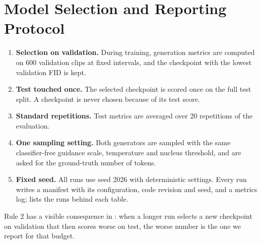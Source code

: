 \section{Model Selection and Reporting Protocol}
\label{sec:protocol_selection}

\begin{enumerate}
\item \textbf{Selection on validation.} During training, generation metrics are computed on 600 validation clips at fixed intervals, and the checkpoint with the lowest validation FID is kept.
\item \textbf{Test touched once.} The selected checkpoint is scored once on the full test split. A checkpoint is never chosen because of its test score.
\item \textbf{Standard repetitions.} Test metrics are averaged over 20 repetitions of the evaluation.
\item \textbf{One sampling setting.} Both generators are sampled with the same classifier-free guidance scale, temperature and nucleus threshold, and are asked for the ground-truth number of tokens.
\item \textbf{Fixed seed.} All runs use seed 2026 with deterministic settings. Every run writes a manifest with its configuration, code revision and seed, and a metrics log;  lists the runs behind each table.
\end{enumerate}

Rule 2 has a visible consequence in : when a longer run selects a new checkpoint on validation that then scores worse on test, the worse number is the one we report for that budget.

